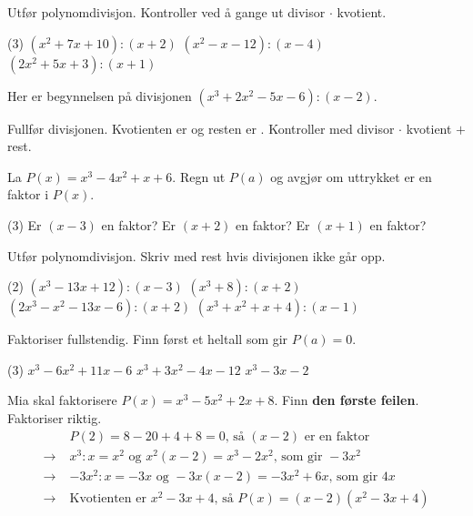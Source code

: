 
Utfør polynomdivisjon. Kontroller ved å gange ut divisor $\cdot$ kvotient.
\begin{tasks}(3)
  \task $(x^2 + 7x + 10) : (x + 2)$
  \task $(x^2 - x - 12) : (x - 4)$
  \task $(2x^2 + 5x + 3) : (x + 1)$
\end{tasks}

Her er begynnelsen på divisjonen $(x^3 + 2x^2 - 5x - 6) : (x - 2)$.


Fullfør divisjonen. Kvotienten er \skrivlinje[4cm] og resten er \rute. Kontroller med divisor $\cdot$ kvotient $+$ rest.

La $P(x) = x^3 - 4x^2 + x + 6$. Regn ut $P(a)$ og avgjør om uttrykket er en faktor i $P(x)$.
\begin{tasks}(3)
  \task Er $(x - 3)$ en faktor?
  \task Er $(x + 2)$ en faktor?
  \task Er $(x + 1)$ en faktor?
\end{tasks}


Utfør polynomdivisjon. Skriv med rest hvis divisjonen ikke går opp.
\begin{tasks}(2)
  \task $(x^3 - 13x + 12) : (x - 3)$
  \task $(x^3 + 8) : (x + 2)$
  \task $(2x^3 - x^2 - 13x - 6) : (x + 2)$
  \task $(x^3 + x^2 + x + 4) : (x - 1)$
\end{tasks}

Faktoriser fullstendig. Finn først et heltall som gir $P(a) = 0$.
\begin{tasks}(3)
  \task $x^3 - 6x^2 + 11x - 6$
  \task $x^3 + 3x^2 - 4x - 12$
  \task $x^3 - 3x - 2$
\end{tasks}

Mia skal faktorisere $P(x) = x^3 - 5x^2 + 2x + 8$. Finn \textbf{den første feilen}. Faktoriser riktig.
\[ \begin{aligned}
&P(2) = 8 - 20 + 4 + 8 = 0\text{, så } (x - 2) \text{ er en faktor}\\
\longrightarrow\;&x^3 : x = x^2 \text{ og } x^2(x-2) = x^3 - 2x^2 \text{, som gir } -3x^2\\
\longrightarrow\;&-3x^2 : x = -3x \text{ og } -3x(x-2) = -3x^2 + 6x \text{, som gir } 4x\\
\longrightarrow\;&\text{Kvotienten er } x^2 - 3x + 4 \text{, så } P(x) = (x-2)(x^2 - 3x + 4)
\end{aligned} \]


